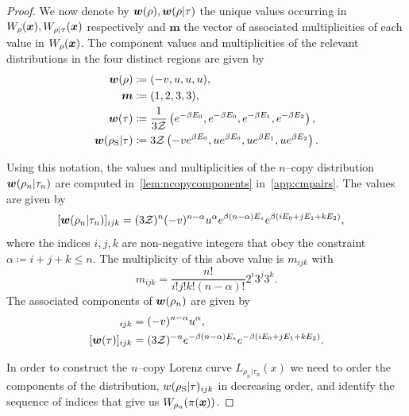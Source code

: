 \documentclass[pra,
aps,
twocolumn,
superscriptaddress,
groupedaddress,
nofootinbib,
reprint
]{revtex4-1}
\begin{document}
\begin{proof}
We now denote by $\boldsymbol{w}(\rho), \boldsymbol{w}(\rho|\tau)$ the unique values occurring in $W_\rho(\boldsymbol{x}), W_{\rho|\tau}(\boldsymbol{x})$ respectively and $\mathbf{m}$ the vector of associated multiplicities of each value in $W_\rho(\boldsymbol{x})$. The component values and multiplicities of the relevant distributions in the four distinct regions are given by
\begin{align}
	\boldsymbol{w}(\rho) &\coloneqq (-v, u, u, u), \\
		\bm{m} &\coloneqq (1,2,3,3), \\
	\bm{w}(\tau) &\coloneqq \frac{1}{3\mathcal{Z}} \left( e^{-\beta E_0}, e^{-\beta E_0}, e^{-\beta E_1}, e^{-\beta E_2} \right), \\
	\bm{w}(\rho_{\rm{S}} | \tau) &\coloneqq 3\mathcal{Z} \left( -v e^{\beta E_0}, u e^{\beta E_0}, u e^{\beta E_1}, u e^{\beta E_2} \right). \label{eq:bmw_rescaled}
\end{align}

Using this notation, the values and multiplicities of the $n$--copy distribution $\bm{w}(\rho_n |\tau_n)$ are computed in~\cref{lem:ncopycomponents} in~\cref{app:cmpairs}. The values are given by 
\begin{align}\label{eq:ncopy_w_rescaled}
	[\boldsymbol{w}(\rho_n | \tau_n)]_{ijk} &= (3\mathcal{Z})^{n} (-v)^{n-\alpha} u^{\alpha} e^{\beta (n-\alpha)E_s} e^{\beta ( i E_0 + j E_1 + k E_2 )},
\end{align}
where the indices $i,j,k$ are non-negative integers that obey the constraint $\alpha \coloneqq i+j+k \leq n$.
The multiplicity of this above value is $m_{ijk}$ with
\begin{equation}
	m_{ijk} = \frac{n!}{i!j!k!(n-\alpha)!} 2^i 3^j 3^k.
\end{equation}
The associated components of $\boldsymbol{w}(\rho_n)$ are given by
\begin{align}
	[\w(\rho_n)]_{ijk} &= (-v)^{n-\alpha} u^{\alpha}, \label{eq:ncopy_wrho}\\
	[\w(\tau)]_{ijk} &= (3\Z)^{-n} e^{-\beta (n-\alpha)E_s} e^{-\beta ( i E_0 + j E_1 + k E_2 )}. \label{eq:ncopy_wsigma}
\end{align}

In order to construct the $n$--copy Lorenz curve $L_{\rho_n|\tau_n}(x)$ we need to order the components of the distribution, $w(\rho_{\rm{S}} | \tau)_{ijk}$ in decreasing order, and identify the sequence of indices that give us $W_{\rho_n}(\pi(\boldsymbol{x}))$.


\end{proof}
\end{document}
